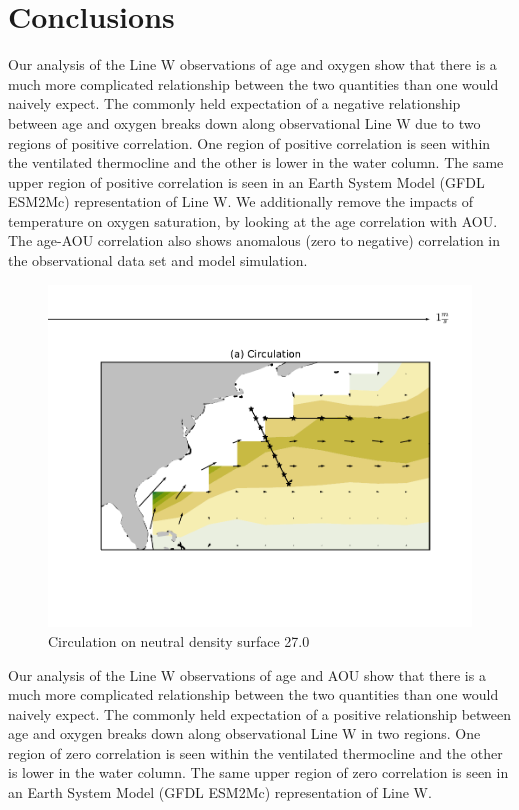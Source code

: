 \section{Conclusions}
\label{section:conclusions}

Our analysis of the Line W observations of age and oxygen show that there is a much more complicated relationship between the two quantities than one would naively expect. The commonly held expectation of a negative relationship between age and oxygen breaks down along observational Line W due to two regions of positive correlation. One region of positive correlation is seen within the ventilated thermocline and the other is lower in the water column. The same upper region of positive correlation is seen in an Earth System Model (GFDL ESM2Mc) representation of Line W. We additionally remove the impacts of temperature on oxygen saturation, by looking at the age correlation with AOU. The age-AOU correlation also shows anomalous (zero to negative) correlation in the observational data set and model simulation.

\begin{figure}
\centering
\includegraphics[width=\linewidth]{circulation.pdf}
\caption{Circulation on neutral density surface 27.0}
\label{fig:circulation}
\end{figure}

Our analysis of the Line W observations of age and AOU show that there is a much
more complicated relationship between the two quantities than one would naively
expect. The commonly held expectation of a positive relationship between age and
oxygen breaks down along observational Line W in two regions. One region of zero
correlation is seen within the ventilated thermocline and the other is lower in
the water column. The same upper region of zero correlation is seen in an Earth
System Model (GFDL ESM2Mc) representation of Line W.

